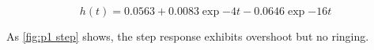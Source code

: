 \begin{equation}
	\label{eq:p1 step time}
	h(t) = 0.0563 + 0.0083\exp{-4t} -0.0646\exp{-16t}
\end{equation}



As \cref{fig:p1 step} shows, the step response exhibits overshoot but no ringing.